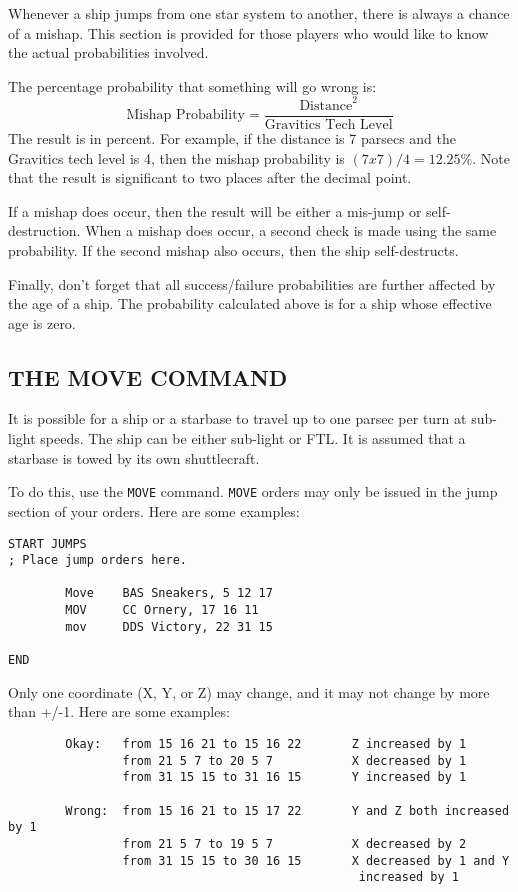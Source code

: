 \documentclass[10pt,titlepage]{article}
\begin{document}
Whenever a ship jumps from one star system to another, there is always a chance
of a mishap.  This section is provided for those players who would like to know
the actual probabilities involved.

The percentage probability that something will go wrong is:
\[
	\textrm{Mishap Probability}  =  \dfrac{\textrm{Distance}^2}{\textrm{Gravitics Tech Level}}
\]
The result is in percent.  For example, if the distance is 7 parsecs and the
Gravitics tech level is 4, then the mishap probability is $(7 x 7)/4 = 12.25\%$.
Note that the result is significant to two places after the decimal point.

If a mishap does occur, then the result will be either a mis-jump or self-
destruction.  When a mishap does occur, a second check is made using the same
probability.  If the second mishap also occurs, then the ship self-destructs.

Finally, don't forget that all success/failure probabilities are further
affected by the age of a ship.  The probability calculated above is for a ship
whose effective age is zero.


\subsection{THE MOVE COMMAND}
\label{sec:movecommand}


It is possible for a ship or a starbase to travel up to one parsec per turn at
sub-light speeds.  The ship can be either sub-light or FTL.  It is assumed that
a starbase is towed by its own shuttlecraft.

To do this, use the \texttt{MOVE} command.  \texttt{MOVE} orders may only be issued in the
jump section of your orders.  Here are some examples:

\begin{verbatim}
START JUMPS
; Place jump orders here.

        Move    BAS Sneakers, 5 12 17
        MOV     CC Ornery, 17 16 11
        mov     DDS Victory, 22 31 15

END
\end{verbatim} 

Only one coordinate (X, Y, or Z) may change, and it may not change by more than
+/-1.  Here are some examples:

\begin{verbatim}
        Okay:   from 15 16 21 to 15 16 22       Z increased by 1
                from 21 5 7 to 20 5 7           X decreased by 1
                from 31 15 15 to 31 16 15       Y increased by 1

        Wrong:  from 15 16 21 to 15 17 22       Y and Z both increased by 1
                from 21 5 7 to 19 5 7           X decreased by 2
                from 31 15 15 to 30 16 15       X decreased by 1 and Y
                                                 increased by 1
\end{verbatim} 
\end{document}
